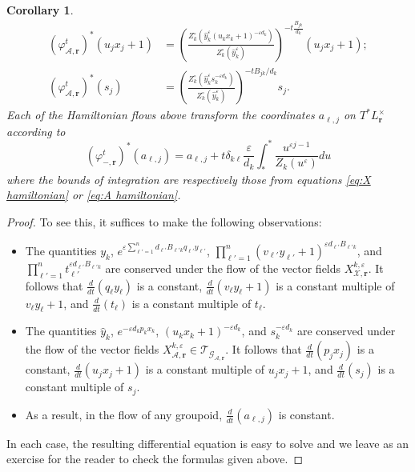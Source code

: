 \documentclass{amsart}
\newtheorem{corollary}[theorem]{Corollary}
\numberwithin{equation}{section}
\newcommand{\bfr}{{\boldsymbol{r}}}
\newcommand{\cA}{\mathcal{A}}
\newcommand{\cG}{\mathcal{G}}
\newcommand{\cT}{\mathcal{T}}
\newcommand{\cX}{\mathcal{X}}
\begin{document}
\begin{corollary}
\begin{align*}
    (\varphi_{\cA,\bfr}^t)^*(u_jx_j+1)&=\left(\frac{Z_k^\circ\left(\hat y_k^\varepsilon (u_kx_k+1)^{-\varepsilon d_k}\right)}{Z_k^\circ(\hat y_k^\varepsilon)}\right)^{-t\frac{B_{jk}}{d_k}}(u_jx_j+1);\\
    (\varphi_{\cA,\bfr}^t)^*(s_j)&=\left(\frac{Z_k^\circ\left(\hat y_k^\varepsilon s_k^{-\varepsilon d_k}\right)}{Z_k^\circ(\hat y_k^\varepsilon)}\right)^{-tB_{jk}/d_k}s_j.
  \end{align*}
  Each of the Hamiltonian flows above transform the coordinates $a_{\ell,j}$ on $T^*L^\times_\bfr$ according to
  \begin{equation*}
    (\varphi_{-,\bfr}^t)^*(a_{\ell,j})=a_{\ell,j}+t\delta_{k\ell}\frac{\varepsilon}{d_k}\int_*^* \frac{u^{\varepsilon j-1}}{Z_k(u^\varepsilon)}du
  \end{equation*}
  where the bounds of integration are respectively those from equations \eqref{eq:X hamiltonian} or \eqref{eq:A hamiltonian}.
\end{corollary}
\begin{proof}
  To see this, it suffices to make the following observations:
  \begin{itemize}
    \item The quantities $y_k$, $e^{\varepsilon\sum_{\ell'=1}^n d_{\ell'} B_{\ell' k}q_{\ell'} y_{\ell'}}$, $\prod_{\ell'=1}^n (v_{\ell'}y_{\ell'}+1)^{\varepsilon d_{\ell'} B_{\ell' k}}$, and $\prod_{\ell'=1}^nt_{\ell'}^{\varepsilon d_{\ell'} B_{\ell' k}}$ are conserved under the flow of the vector fields $X_{\cX,\bfr}^{k,\varepsilon}$.
      It follows that $\frac{d}{dt}(q_\ell y_\ell)$ is a constant, $\frac{d}{dt}(v_\ell y_\ell+1)$ is a constant multiple of $v_\ell y_\ell+1$, and $\frac{d}{dt}(t_\ell)$ is a constant multiple of $t_\ell$.
    \item The quantities $\hat y_k$, $e^{-\varepsilon d_kp_kx_k}$, $(u_k x_k + 1)^{-\varepsilon d_k}$, and $s_k^{-\varepsilon d_k}$ are conserved under the flow of the vector fields $X_{\cA,\bfr}^{k,\varepsilon}\in\cT_{\cG_{\cA,\bfr}}$.
      It follows that $\frac{d}{dt}(p_jx_j)$ is a constant, $\frac{d}{dt}(u_j x_j + 1)$ is a constant multiple of $u_j x_j+1$, and $\frac{d}{dt}(s_j)$ is a constant multiple of $s_j$.
    \item As a result, in the flow of any groupoid, $\frac{d}{dt}(a_{\ell,j})$ is constant.
  \end{itemize}
  In each case, the resulting differential equation is easy to solve and we leave as an exercise for the reader to check the formulas given above.
\end{proof}
\end{document}
